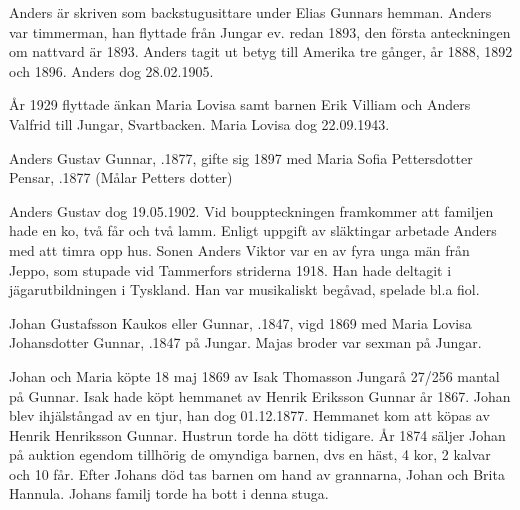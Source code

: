 Anders är skriven som backstugusittare under Elias Gunnars hemman. Anders var timmerman, han flyttade från Jungar ev. redan 1893, den första anteckningen om nattvard är 1893. Anders tagit ut betyg till Amerika tre gånger, år 1888, 1892 och 1896. Anders dog 28.02.1905.

År 1929 flyttade änkan Maria Lovisa samt barnen Erik Villiam och Anders Valfrid till Jungar, Svartbacken. Maria Lovisa dog 22.09.1943.


Anders Gustav Gunnar, .1877, gifte sig 1897 med Maria Sofia Pettersdotter Pensar, .1877 (Målar Petters dotter)
\begin{jhchildren}
  \item {}
  \item {}
  \item {}
\end{jhchildren}

Anders Gustav dog 19.05.1902. Vid bouppteckningen framkommer att familjen hade en ko, två får och två lamm. Enligt uppgift av släktingar arbetade Anders med att timra opp hus. Sonen Anders Viktor var en av fyra unga män från Jeppo, som stupade vid Tammerfors striderna 1918. Han hade deltagit i jägarutbildningen i Tyskland. Han var musikaliskt begåvad, spelade bl.a fiol.


Johan Gustafsson Kaukos eller Gunnar, .1847, vigd 1869 med Maria Lovisa Johansdotter Gunnar, .1847 på Jungar. Majas broder var sexman på Jungar.
\begin{jhchildren}
  \item {}
  \item {}
  \item {}
\end{jhchildren}

Johan och Maria köpte 18 maj 1869 av Isak Thomasson Jungarå 27/256 mantal på Gunnar. Isak hade köpt hemmanet av Henrik Eriksson Gunnar år 1867. Johan blev ihjälstångad av en tjur, han dog 01.12.1877. Hemmanet kom att köpas av Henrik Henriksson Gunnar. Hustrun torde ha dött tidigare. År 1874 säljer Johan på auktion egendom tillhörig de omyndiga barnen, dvs en häst, 4 kor, 2 kalvar och 10 får. Efter Johans död tas barnen om hand av grannarna, Johan och Brita Hannula. Johans familj torde ha bott i denna stuga.



